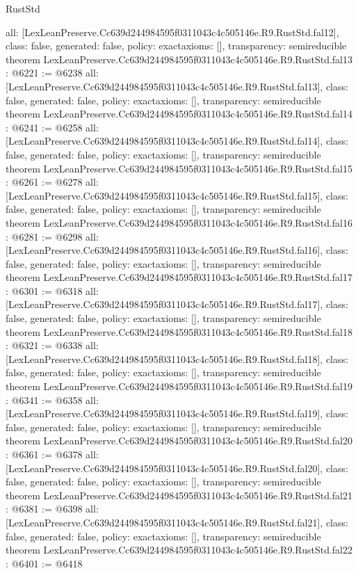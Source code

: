\begin{lexlean}{RustStd}
\begin{coremodule}
{  all: [LexLeanPreserve.Cc639d244984595f0311043c4c505146e.R9.RustStd.fal12],
  class: false,
  generated: false,
  policy: exact{axioms: []},
  transparency: semireducible
}
theorem LexLeanPreserve.Cc639d244984595f0311043c4c505146e.R9.RustStd.fal13 : @6221 := @6238 {
  all: [LexLeanPreserve.Cc639d244984595f0311043c4c505146e.R9.RustStd.fal13],
  class: false,
  generated: false,
  policy: exact{axioms: []},
  transparency: semireducible
}
theorem LexLeanPreserve.Cc639d244984595f0311043c4c505146e.R9.RustStd.fal14 : @6241 := @6258 {
  all: [LexLeanPreserve.Cc639d244984595f0311043c4c505146e.R9.RustStd.fal14],
  class: false,
  generated: false,
  policy: exact{axioms: []},
  transparency: semireducible
}
theorem LexLeanPreserve.Cc639d244984595f0311043c4c505146e.R9.RustStd.fal15 : @6261 := @6278 {
  all: [LexLeanPreserve.Cc639d244984595f0311043c4c505146e.R9.RustStd.fal15],
  class: false,
  generated: false,
  policy: exact{axioms: []},
  transparency: semireducible
}
theorem LexLeanPreserve.Cc639d244984595f0311043c4c505146e.R9.RustStd.fal16 : @6281 := @6298 {
  all: [LexLeanPreserve.Cc639d244984595f0311043c4c505146e.R9.RustStd.fal16],
  class: false,
  generated: false,
  policy: exact{axioms: []},
  transparency: semireducible
}
theorem LexLeanPreserve.Cc639d244984595f0311043c4c505146e.R9.RustStd.fal17 : @6301 := @6318 {
  all: [LexLeanPreserve.Cc639d244984595f0311043c4c505146e.R9.RustStd.fal17],
  class: false,
  generated: false,
  policy: exact{axioms: []},
  transparency: semireducible
}
theorem LexLeanPreserve.Cc639d244984595f0311043c4c505146e.R9.RustStd.fal18 : @6321 := @6338 {
  all: [LexLeanPreserve.Cc639d244984595f0311043c4c505146e.R9.RustStd.fal18],
  class: false,
  generated: false,
  policy: exact{axioms: []},
  transparency: semireducible
}
theorem LexLeanPreserve.Cc639d244984595f0311043c4c505146e.R9.RustStd.fal19 : @6341 := @6358 {
  all: [LexLeanPreserve.Cc639d244984595f0311043c4c505146e.R9.RustStd.fal19],
  class: false,
  generated: false,
  policy: exact{axioms: []},
  transparency: semireducible
}
theorem LexLeanPreserve.Cc639d244984595f0311043c4c505146e.R9.RustStd.fal20 : @6361 := @6378 {
  all: [LexLeanPreserve.Cc639d244984595f0311043c4c505146e.R9.RustStd.fal20],
  class: false,
  generated: false,
  policy: exact{axioms: []},
  transparency: semireducible
}
theorem LexLeanPreserve.Cc639d244984595f0311043c4c505146e.R9.RustStd.fal21 : @6381 := @6398 {
  all: [LexLeanPreserve.Cc639d244984595f0311043c4c505146e.R9.RustStd.fal21],
  class: false,
  generated: false,
  policy: exact{axioms: []},
  transparency: semireducible
}
theorem LexLeanPreserve.Cc639d244984595f0311043c4c505146e.R9.RustStd.fal22 : @6401 := @6418 {
}
\end{coremodule}
\end{lexlean}
